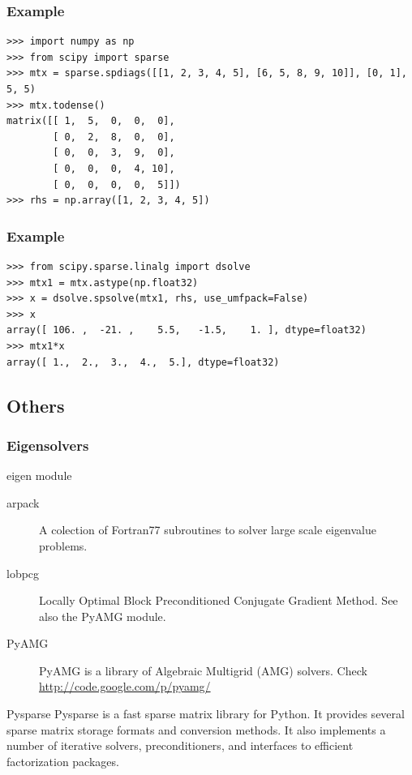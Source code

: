\documentclass[10pt,colorlinks]{beamer}
\begin{document}
\begin{frame}[fragile]\frametitle{Example}
\begin{verbatim}
>>> import numpy as np
>>> from scipy import sparse
>>> mtx = sparse.spdiags([[1, 2, 3, 4, 5], [6, 5, 8, 9, 10]], [0, 1], 5, 5)
>>> mtx.todense()
matrix([[ 1,  5,  0,  0,  0],
        [ 0,  2,  8,  0,  0],
        [ 0,  0,  3,  9,  0],
        [ 0,  0,  0,  4, 10],
        [ 0,  0,  0,  0,  5]])
>>> rhs = np.array([1, 2, 3, 4, 5])
\end{verbatim}

\end{frame}

\begin{frame}[fragile]\frametitle{Example}
\begin{verbatim}
>>> from scipy.sparse.linalg import dsolve
>>> mtx1 = mtx.astype(np.float32)
>>> x = dsolve.spsolve(mtx1, rhs, use_umfpack=False)
>>> x
array([ 106. ,  -21. ,    5.5,   -1.5,    1. ], dtype=float32)
>>> mtx1*x 
array([ 1.,  2.,  3.,  4.,  5.], dtype=float32)
\end{verbatim}

\end{frame}


\subsection{Others} %
\label{sub:other}
\begin{frame}[fragile]\frametitle{Eigensolvers}
\begin{block}{eigen module}
\begin{description}
    \item[arpack] A colection of Fortran77 subroutines to solver large scale eigenvalue problems.
    \item[lobpcg]  Locally Optimal Block Preconditioned Conjugate Gradient Method. See also the PyAMG module.
    \item[PyAMG] PyAMG is a library of Algebraic Multigrid (AMG) solvers. Check \href{http://code.google.com/p/pyamg/}{http://code.google.com/p/pyamg/}
\end{description}\end{block}
\begin{block}{Pysparse}
Pysparse is a fast sparse matrix library for Python. It provides several sparse matrix storage formats and conversion methods. It also implements a number of iterative solvers, preconditioners, and interfaces to efficient factorization packages.
\end{block}


\end{frame}
\end{document}
